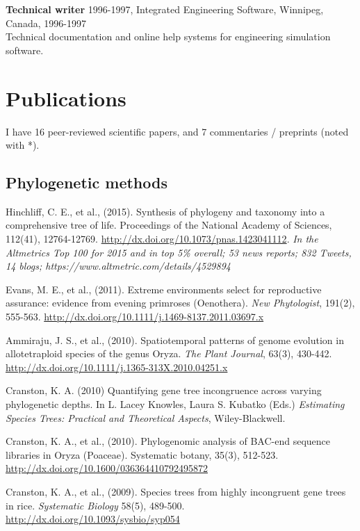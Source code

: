 \documentclass[10pt]{article}
\begin{document}
\noindent \textbf{Technical writer}
1996-1997, Integrated Engineering Software, Winnipeg, Canada, 1996-1997 \\
Technical documentation and online help systems for engineering simulation software. \\

\section*{Publications}

I have 16 peer-reviewed scientific papers, and 7 commentaries / preprints (noted with *).

\subsection*{Phylogenetic methods}
Hinchliff, C. E., et al., (2015). Synthesis of phylogeny and taxonomy into a comprehensive tree of life. Proceedings of the National Academy of Sciences, 112(41), 12764-12769. \url{http://dx.doi.org/10.1073/pnas.1423041112}. \textit{In the Altmetrics Top 100 for 2015 and in top 5\% overall; 53 news reports; 832 Tweets, 14 blogs; https://www.altmetric.com/details/4529894}

Evans, M. E., et al., (2011). Extreme environments select for reproductive assurance: evidence from evening primroses (Oenothera). \textit{New Phytologist}, 191(2), 555-563. \url{http://dx.doi.org/10.1111/j.1469-8137.2011.03697.x} 

Ammiraju, J. S., et al., (2010). Spatiotemporal patterns of genome evolution in allotetraploid species of the genus Oryza. \textit{The Plant Journal}, 63(3), 430-442. \url{http://dx.doi.org/10.1111/j.1365-313X.2010.04251.x} 

Cranston, K. A. (2010) Quantifying gene tree incongruence across varying phylogenetic depths. In L. Lacey Knowles, Laura S. Kubatko (Eds.) \textit{Estimating Species Trees: Practical and Theoretical Aspects}, Wiley-Blackwell.

Cranston, K. A., et al., (2010). Phylogenomic analysis of BAC-end sequence libraries in Oryza (Poaceae). Systematic botany, 35(3), 512-523. \url{http://dx.doi.org/10.1600/036364410792495872} 

Cranston, K. A., et al., (2009). Species trees from highly incongruent gene trees in rice.  \textit{Systematic Biology} 58(5), 489-500. \url{http://dx.doi.org/10.1093/sysbio/syp054} 
\end{document}
